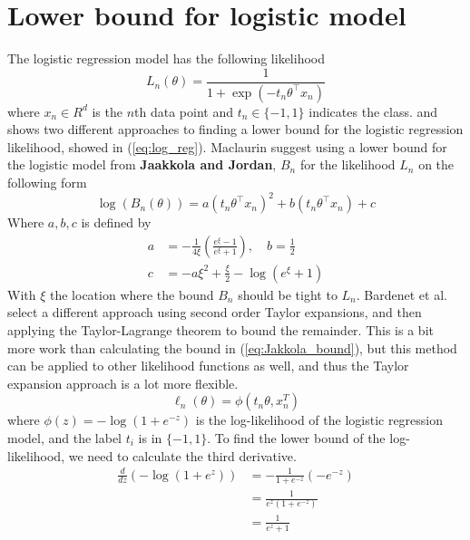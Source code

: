 \documentclass{article}
\theoremstyle{definition}
\begin{document}
\section{Lower bound for logistic model}
The logistic regression model has the following likelihood 
\begin{equation}\label{eq:log_reg}
    L_n\left(\theta\right) = \frac{1}{1 + \exp\left(-t_n\theta^{\top} x_n\right)} 
\end{equation}
where $x_n \in R^d$ is the $n$th data point and $t_n\in \{-1, 1\}$ indicates the class. 
\cite{Maclaurin:1} and \cite{Bardenet:1} shows two different approaches to finding a lower bound for the logistic regression likelihood, showed in (\ref{eq:log_reg}). Maclaurin suggest using a lower bound for the logistic model from \textbf{Jaakkola and Jordan},  $B_n$ for the likelihood $L_n$ on the following form 
\begin{equation}\label{eq:Jakkola_bound}
    \log\left(B_n\left(\theta\right)\right) = a\left(t_n\theta^{\top}x_n\right)^2 + b\left(t_n\theta^{\top} x_n\right) + c
\end{equation}
Where $a,b,c$ is defined by
\begin{equation}
\begin{split}
    a &= -\frac{1}{4\xi}\left(\frac{e^{\xi} - 1}{e^{\xi} + 1}\right), \quad b = \frac{1}{2} \\
    c &= -a\xi^2 + \frac{\xi}{2} - \log\left(e^{\xi} + 1\right)
\end{split}
\end{equation}
With $\xi$ the location where the bound $B_n$ should be tight to $L_n$. 
Bardenet et al. select a different approach using second order Taylor expansions, and then applying the Taylor-Lagrange theorem to bound the remainder. This is a bit more work than calculating the bound in  (\ref{eq:Jakkola_bound}), but this method can be applied to other likelihood functions as well, and thus the Taylor expansion approach is a lot more flexible. 
\begin{equation*}
\ell_n(\theta) = \phi\left(t_n\theta, x_n^T\right)
\end{equation*}
where $\phi(z) = -\log\left( 1  + e^{-z}\right)$ is the log-likelihood of the logistic regression model, and the label $t_i$ is in $\{-1, 1\}$. To find the lower bound of the log-likelihood, we need to calculate the third derivative. 
\begin{equation*}
\begin{split}
\frac{d}{dz} \left( - \log\left(1 + e^z\right)\right) &= - \frac{1}{1 + e^{-z}} \left(-e^{-z}\right) \\
& = \frac{1}{e^z \left(1+e^{-z}\right)} \\
& = \frac{1}{e^z + 1}
\end{split}
\end{equation*}
\end{document}
